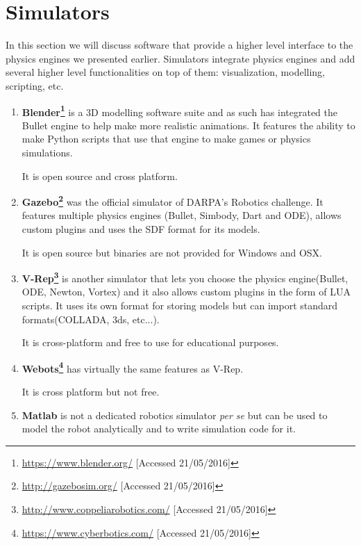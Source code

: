 \section{Simulators}
In this section we will discuss software that provide a higher level interface to the physics engines we presented earlier. Simulators integrate physics engines and add several higher level functionalities on top of them: visualization, modelling, scripting, etc. 
\begin{enumerate}

\item \textbf{Blender\footnote{\url{https://www.blender.org/} [Accessed 21/05/2016]}} is a 3D modelling software suite and as such has integrated the Bullet engine to help make more realistic animations. It features the ability to make Python scripts that use that engine to make games or physics simulations. 

It is open source and cross platform.

\item \textbf{Gazebo\footnote{\url{http://gazebosim.org/} [Accessed 21/05/2016]}} was the official simulator of DARPA's Robotics challenge. It features multiple physics engines (Bullet, Simbody, Dart and ODE), allows custom plugins and uses the SDF format for its models. 

It is open source but binaries are not provided for Windows and OSX.

\item \textbf{V-Rep\footnote{\url{http://www.coppeliarobotics.com/} [Accessed 21/05/2016]}} is another simulator that lets you choose the physics engine(Bullet, ODE, Newton, Vortex) and it also allows custom plugins in the form of LUA scripts. It uses its own format for storing models but can import standard formats(COLLADA, 3ds, etc...).

It is cross-platform and free to use for educational purposes.

\item \textbf{Webots\footnote{\url{https://www.cyberbotics.com/} [Accessed 21/05/2016]}} has virtually the same features as V-Rep.

It is cross platform but not free.

\item \textbf{Matlab} is not a dedicated robotics simulator \textit{per se} but can be used to model the robot analytically and to write simulation code for it. 
\end{enumerate}
%
